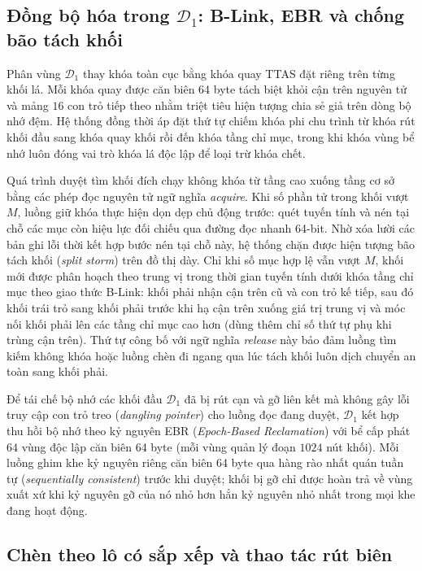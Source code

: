 \subsection{Đồng bộ hóa trong $\mathcal{D}_1$: B-Link, EBR và chống bão tách khối}\label{subsec:c2-d1-sync}

Phân vùng $\mathcal{D}_1$ thay khóa toàn cục bằng khóa quay TTAS đặt riêng trên từng khối lá. Mỗi khóa quay được căn biên 64 byte tách biệt khỏi cận trên nguyên tử và mảng $16$ con trỏ tiếp theo nhằm triệt tiêu hiện tượng chia sẻ giả trên dòng bộ nhớ đệm. Hệ thống đồng thời áp đặt thứ tự chiếm khóa phi chu trình từ khóa rút khối đầu sang khóa quay khối rồi đến khóa tầng chỉ mục, trong khi khóa vùng bể nhớ luôn đóng vai trò khóa lá độc lập để loại trừ khóa chết.

Quá trình duyệt tìm khối đích chạy không khóa từ tầng cao xuống tầng cơ sở bằng các phép đọc nguyên tử ngữ nghĩa \textit{acquire}. Khi số phần tử trong khối vượt $M$, luồng giữ khóa thực hiện dọn dẹp chủ động trước: quét tuyến tính và nén tại chỗ các mục còn hiệu lực đối chiếu qua đường đọc nhanh 64-bit. Nhờ xóa lười các bản ghi lỗi thời kết hợp bước nén tại chỗ này, hệ thống chặn được hiện tượng bão tách khối (\textit{split storm}) trên đồ thị dày. Chỉ khi số mục hợp lệ vẫn vượt $M$, khối mới được phân hoạch theo trung vị trong thời gian tuyến tính dưới khóa tầng chỉ mục theo giao thức B-Link: khối phải nhận cận trên cũ và con trỏ kế tiếp, sau đó khối trái trỏ sang khối phải trước khi hạ cận trên xuống giá trị trung vị và móc nối khối phải lên các tầng chỉ mục cao hơn (dùng thêm chỉ số thứ tự phụ khi trùng cận trên). Thứ tự công bố với ngữ nghĩa \textit{release} này bảo đảm luồng tìm kiếm không khóa hoặc luồng chèn đi ngang qua lúc tách khối luôn dịch chuyển an toàn sang khối phải.

Để tái chế bộ nhớ các khối đầu $\mathcal{D}_1$ đã bị rút cạn và gỡ liên kết mà không gây lỗi truy cập con trỏ treo (\textit{dangling pointer}) cho luồng đọc đang duyệt, $\mathcal{D}_1$ kết hợp thu hồi bộ nhớ theo kỷ nguyên EBR (\textit{Epoch-Based Reclamation}) với bể cấp phát $64$ vùng độc lập căn biên 64 byte (mỗi vùng quản lý đoạn $1024$ nút khối). Mỗi luồng ghim khe kỷ nguyên riêng căn biên 64 byte qua hàng rào nhất quán tuần tự (\textit{sequentially consistent}) trước khi duyệt; khối bị gỡ chỉ được hoàn trả về vùng xuất xứ khi kỷ nguyên gỡ của nó nhỏ hơn hẳn kỷ nguyên nhỏ nhất trong mọi khe đang hoạt động.

\subsection{Chèn theo lô có sắp xếp và thao tác rút biên}\label{subsec:c2-batch-pull}

